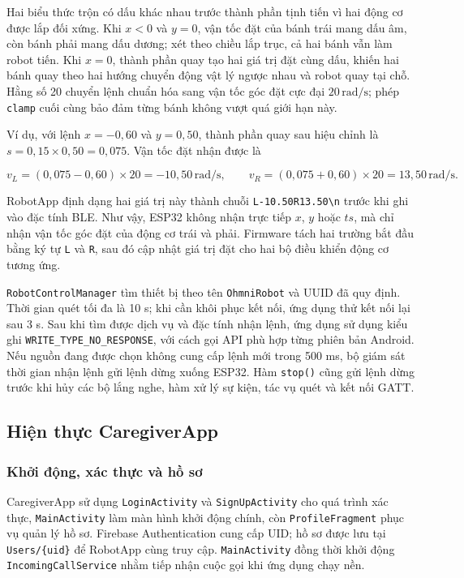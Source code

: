 Hai biểu thức trộn có dấu khác nhau trước thành phần tịnh tiến vì hai động cơ được lắp đối xứng. Khi $x<0$ và $y=0$, vận tốc đặt của bánh trái mang dấu âm, còn bánh phải mang dấu dương; xét theo chiều lắp trục, cả hai bánh vẫn làm robot tiến. Khi $x=0$, thành phần quay tạo hai giá trị đặt cùng dấu, khiến hai bánh quay theo hai hướng chuyển động vật lý ngược nhau và robot quay tại chỗ. Hằng số 20 chuyển lệnh chuẩn hóa sang vận tốc góc đặt cực đại $20\,\mathrm{rad/s}$; phép \texttt{clamp} cuối cùng bảo đảm từng bánh không vượt quá giới hạn này.

Ví dụ, với lệnh $x=-0{,}60$ và $y=0{,}50$, thành phần quay sau hiệu chỉnh là $s=0{,}15\times0{,}50=0{,}075$. Vận tốc đặt nhận được là

\begin{equation}
v_L=(0{,}075-0{,}60)\times20=-10{,}50\,\mathrm{rad/s},\qquad
v_R=(0{,}075+0{,}60)\times20=13{,}50\,\mathrm{rad/s}.
\end{equation}

RobotApp định dạng hai giá trị này thành chuỗi \texttt{L-10.50R13.50\textbackslash n} trước khi ghi vào đặc tính BLE. Như vậy, ESP32 không nhận trực tiếp $x$, $y$ hoặc $ts$, mà chỉ nhận vận tốc góc đặt của động cơ trái và phải. Firmware tách hai trường bắt đầu bằng ký tự \texttt{L} và \texttt{R}, sau đó cập nhật giá trị đặt cho hai bộ điều khiển động cơ tương ứng.

\texttt{RobotControlManager} tìm thiết bị theo tên \texttt{OhmniRobot} và UUID đã quy định. Thời gian quét tối đa là 10 s; khi cần khôi phục kết nối, ứng dụng thử kết nối lại sau 3 s. Sau khi tìm được dịch vụ và đặc tính nhận lệnh, ứng dụng sử dụng kiểu ghi \texttt{WRITE\_TYPE\_NO\_RESPONSE}, với cách gọi API phù hợp từng phiên bản Android. Nếu nguồn đang được chọn không cung cấp lệnh mới trong 500 ms, bộ giám sát thời gian nhận lệnh gửi lệnh dừng xuống ESP32. Hàm \texttt{stop()} cũng gửi lệnh dừng trước khi hủy các bộ lắng nghe, hàm xử lý sự kiện, tác vụ quét và kết nối GATT.

\subsection{Hiện thực CaregiverApp}

\subsubsection{Khởi động, xác thực và hồ sơ}

CaregiverApp sử dụng \texttt{LoginActivity} và \texttt{SignUpActivity} cho quá trình xác thực, \texttt{MainActivity} làm màn hình khởi động chính, còn \texttt{ProfileFragment} phục vụ quản lý hồ sơ. Firebase Authentication cung cấp UID; hồ sơ được lưu tại \texttt{Users/\{uid\}} để RobotApp cùng truy cập. \texttt{MainActivity} đồng thời khởi động \texttt{IncomingCallService} nhằm tiếp nhận cuộc gọi khi ứng dụng chạy nền.

